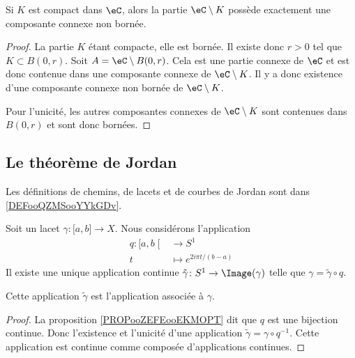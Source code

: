 \begin{lemma}
    Si \( K\) est compact dans \( \eC\), alors la partie \( \eC\setminus K\) possède exactement une composante connexe non bornée.
\end{lemma}

\begin{proof}
    La partie \( K\) étant compacte, elle est bornée. Il existe donc \( r>0\) tel que \( K\subset B(0,r)\). Soit \( A=\eC\setminus B(0,r)\). Cela est une partie connexe de \( \eC\) et est donc contenue dans une composante connexe de \( \eC\setminus K\). Il y a donc existence d'une composante connexe non bornée de \( \eC\setminus K\).

    Pour l'unicité, les autres composantes connexes de \( \eC\setminus K\) sont contenues dans \( B(0,r)\) et sont donc bornées.
\end{proof}

\subsection{Le théorème de Jordan}

Les définitions de chemins, de lacets et de courbes de Jordan sont dans \ref{DEFooQZMSooYYkGDv}.

\begin{lemmaDef}     \label{LEMooZPRLooJPvrOE}
    Soit un lacet \( \gamma\colon \mathopen[ a , b \mathclose]\to X\). Nous considérons l'application
    \begin{equation}
        \begin{aligned}
            q\colon \mathopen[ a , b \mathclose[&\to S^1 \\
            t&\mapsto  e^{2i\pi t/(b-a)} 
        \end{aligned}
    \end{equation}
    Il existe une unique application continue \( \tilde \gamma\colon S^1\to \Image(\gamma)\) telle que \( \gamma=\tilde \gamma\circ q\).

    Cette application \( \tilde \gamma\) est l'application  associée à \( \gamma\).
\end{lemmaDef}

\begin{proof}
    La proposition \ref{PROPooZEFEooEKMOPT} dit que \( q\) est une bijection continue. Donc l'existence et l'unicité d'une application \( \tilde \gamma=\gamma\circ q^{-1}\). Cette application est continue comme composée d'applications continues.
\end{proof}

